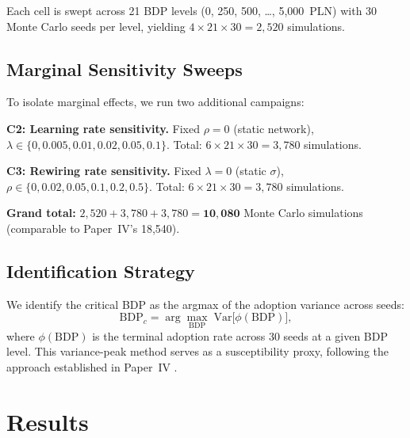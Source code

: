\documentclass[12pt,a4paper]{article}
\begin{document}
Each cell is swept across 21 BDP levels (0, 250, 500, \ldots, 5{,}000~PLN)
with 30 Monte Carlo seeds per level, yielding $4 \times 21 \times 30 =
2{,}520$ simulations.

\subsection{Marginal Sensitivity Sweeps}\label{sec:c2c3}

To isolate marginal effects, we run two additional campaigns:

\textbf{C2: Learning rate sensitivity.} Fixed $\rho = 0$ (static network),
$\lambda \in \{0, 0.005, 0.01, 0.02, 0.05, 0.1\}$. Total:
$6 \times 21 \times 30 = 3{,}780$ simulations.

\textbf{C3: Rewiring rate sensitivity.} Fixed $\lambda = 0$ (static
$\sigma$), $\rho \in \{0, 0.02, 0.05, 0.1, 0.2, 0.5\}$. Total:
$6 \times 21 \times 30 = 3{,}780$ simulations.

\textbf{Grand total:} $2{,}520 + 3{,}780 + 3{,}780 = \mathbf{10{,}080}$
Monte Carlo simulations (comparable to Paper~IV's 18,540).

\subsection{Identification Strategy}\label{sec:identification}

We identify the critical BDP as the argmax of the adoption variance
across seeds:
\begin{equation}\label{eq:bdpc}
  \mathrm{BDP}_c = \arg\max_{\mathrm{BDP}} \;
  \mathrm{Var}\!\bigl[\phi(\mathrm{BDP})\bigr],
\end{equation}
where $\phi(\mathrm{BDP})$ is the terminal adoption rate across
30 seeds at a given BDP level. This variance-peak method serves as
a susceptibility proxy, following the approach established in
Paper~IV \parencite[see][]{Maciaszek2026d, Stanley1971, Binder2010}.


\section{Results}\label{sec:results}
\end{document}
